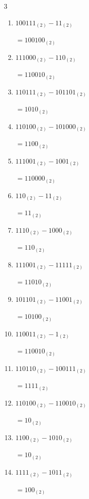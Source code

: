 \begin{multicols}{3}
\begin{enumerate}
  \item $100111_{(2)} - 11_{(2)}$

        $=100100_{(2)}$

  \item $111000_{(2)} - 110_{(2)}$

        $=110010_{(2)}$

  \item $110111_{(2)} - 101101_{(2)}$

        $=1010_{(2)}$

  \item $110100_{(2)} - 101000_{(2)}$

        $=1100_{(2)}$

  \item $111001_{(2)} - 1001_{(2)}$

        $=110000_{(2)}$

  \item $110_{(2)} - 11_{(2)}$

        $=11_{(2)}$

  \item $1110_{(2)} - 1000_{(2)}$

        $=110_{(2)}$

  \item $111001_{(2)} - 11111_{(2)}$

        $=11010_{(2)}$

\columnbreak %

\resetques

  \item $101101_{(2)} - 11001_{(2)}$

        $=10100_{(2)}$

  \item $110011_{(2)} - 1_{(2)}$

        $=110010_{(2)}$

  \item $110110_{(2)} - 100111_{(2)}$

        $=1111_{(2)}$

  \item $110100_{(2)} - 110010_{(2)}$

        $=10_{(2)}$

  \item $1100_{(2)} - 1010_{(2)}$

        $=10_{(2)}$

  \item $1111_{(2)} - 1011_{(2)}$

        $=100_{(2)}$


\end{enumerate}
\end{multicols}
